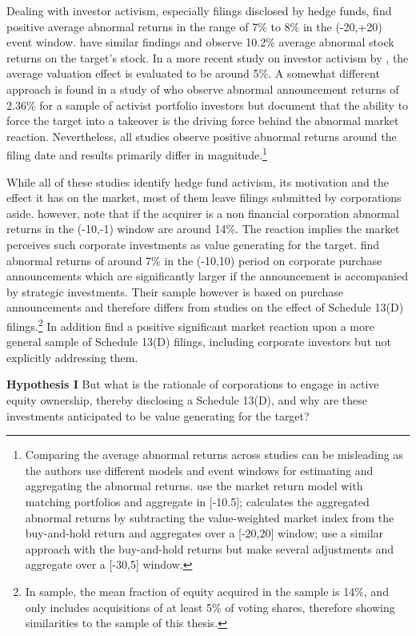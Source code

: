 \documentclass[12pt]{article}
\begin{document}
Dealing with investor activism, especially filings disclosed by hedge funds, \citet[p.1730]{Brav2008} find positive average abnormal returns in the range of 7\% to 8\% in the (-20,+20) event window. \citet[p.188]{Klein2009} have similar findings and observe 10.2\% average abnormal stock returns on the target's stock. In a more recent study on investor activism by \citet[p.410]{Denes2017}, the average valuation effect is evaluated to be around 5\%. A somewhat different approach is found in a study of \citet[p.363]{Greenwood2009} who observe abnormal announcement returns of 2.36\% for a sample of activist portfolio investors but document that the ability to force the target into a takeover is the driving force behind the abnormal market reaction. Nevertheless, all studies observe positive abnormal returns around the filing date and results primarily differ in magnitude.\footnote{Comparing the average abnormal returns across studies can be misleading as the authors use different models and event windows for estimating and aggregating the abnormal returns. \citet{Greenwood2009} use the market return model with matching portfolios and aggregate in [-10.5]; \citet{Brav2008} calculates the aggregated abnormal returns by subtracting the value-weighted market index from the buy-and-hold return and aggregates over a [-20,20] window; \citet{Klein2009} use a similar approach with the buy-and-hold returns but make several adjustments and aggregate over a [-30,5] window.}\par
While all of these studies identify hedge fund activism, its motivation and the effect it has on the market, most of them leave filings submitted by corporations aside. \citet[p.29]{Brigida2012} however, note that if the acquirer is a non financial corporation abnormal returns in the (-10,-1) window are around 14\%. The reaction implies the market perceives such corporate investments as value generating for the target. \citet[p.2803]{Allen2000} find abnormal returns of around 7\% in the (-10,10) period on corporate purchase announcements which are significantly larger if the announcement is accompanied by strategic investments. Their sample however is based on purchase announcements and therefore differs from studies on the effect of Schedule 13(D) filings.\footnote{In \citet[p.2801]{Allen2000} sample, the mean fraction of equity acquired in the sample is 14\%, and  only includes acquisitions of at least 5\% of voting shares, therefore showing similarities to the sample of this thesis.} In addition \citet{Collin-Dufresne2015} find a positive significant market reaction upon a more general sample of Schedule 13(D) filings, including corporate investors but not explicitly addressing them.\par
\textbf{Hypothesis I}
But what is the rationale of corporations to engage in active equity ownership, thereby disclosing a Schedule 13(D), and why are these investments anticipated to be value generating for the target?
\end{document}
